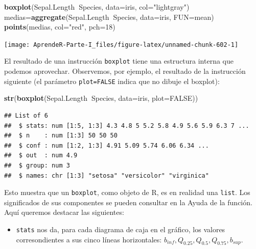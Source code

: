 \documentclass[]{book}
\newenvironment{Shaded}{\begin{snugshade}}{\end{snugshade}}
\newcommand{\DataTypeTok}[1]{\textcolor[rgb]{0.13,0.29,0.53}{#1}}
\newcommand{\DecValTok}[1]{\textcolor[rgb]{0.00,0.00,0.81}{#1}}
\newcommand{\KeywordTok}[1]{\textcolor[rgb]{0.13,0.29,0.53}{\textbf{#1}}}
\newcommand{\NormalTok}[1]{#1}
\newcommand{\OperatorTok}[1]{\textcolor[rgb]{0.81,0.36,0.00}{\textbf{#1}}}
\newcommand{\OtherTok}[1]{\textcolor[rgb]{0.56,0.35,0.01}{#1}}
\newcommand{\StringTok}[1]{\textcolor[rgb]{0.31,0.60,0.02}{#1}}
\providecommand{\tightlist}{%
  \setlength{\itemsep}{0pt}\setlength{\parskip}{0pt}}
\theoremstyle{definition}
\theoremstyle{definition}
\theoremstyle{definition}
\theoremstyle{remark}
\begin{document}
\begin{Shaded}
\begin{Highlighting}[]
\KeywordTok{boxplot}\NormalTok{(Sepal.Length}\OperatorTok{~}\NormalTok{Species, }\DataTypeTok{data=}\NormalTok{iris, }\DataTypeTok{col=}\StringTok{"lightgray"}\NormalTok{)}
\NormalTok{medias=}\KeywordTok{aggregate}\NormalTok{(Sepal.Length}\OperatorTok{~}\NormalTok{Species, }\DataTypeTok{data=}\NormalTok{iris, }\DataTypeTok{FUN=}\NormalTok{mean)}
\KeywordTok{points}\NormalTok{(medias, }\DataTypeTok{col=}\StringTok{"red"}\NormalTok{, }\DataTypeTok{pch=}\DecValTok{18}\NormalTok{)}
\end{Highlighting}
\end{Shaded}

\begin{center}\texttt{[image: AprendeR-Parte-I\_files/figure-latex/unnamed-chunk-602-1]} \end{center}

El resultado de una instrucción \texttt{boxplot} tiene una estructura interna que podemos aprovechar. Observemos, por ejemplo, el resultado de la instrucción siguiente (el parámetro \texttt{plot=FALSE} indica que no dibuje el boxplot):

\begin{Shaded}
\begin{Highlighting}[]
\KeywordTok{str}\NormalTok{(}\KeywordTok{boxplot}\NormalTok{(Sepal.Length}\OperatorTok{~}\NormalTok{Species, }\DataTypeTok{data=}\NormalTok{iris, }\DataTypeTok{plot=}\OtherTok{FALSE}\NormalTok{))}
\end{Highlighting}
\end{Shaded}

\begin{verbatim}
## List of 6
##  $ stats: num [1:5, 1:3] 4.3 4.8 5 5.2 5.8 4.9 5.6 5.9 6.3 7 ...
##  $ n    : num [1:3] 50 50 50
##  $ conf : num [1:2, 1:3] 4.91 5.09 5.74 6.06 6.34 ...
##  $ out  : num 4.9
##  $ group: num 3
##  $ names: chr [1:3] "setosa" "versicolor" "virginica"
\end{verbatim}

Esto muestra que un \texttt{boxplot}, como objeto de R, es en realidad una \texttt{list}. Los significados de sus componentes se pueden consultar en la Ayuda de la función. Aquí queremos destacar las siguientes:

\begin{itemize}
\tightlist
\item
  \texttt{stats} nos da, para cada diagrama de caja en el gráfico, los valores corresondientes a sus cinco líneas horizontales: \(b_{inf}, Q_{0.25}, Q_{0.5}, Q_{0.75}, b_{sup}\).
\end{itemize}
\end{document}
